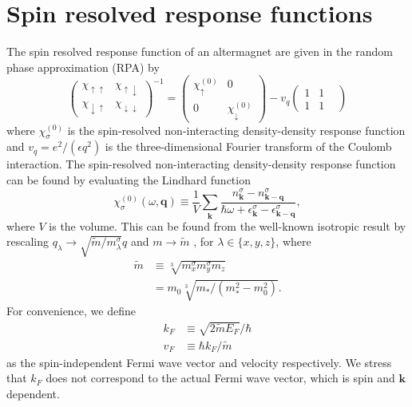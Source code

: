 \documentclass[aps,prb,reprint,twocolumns,superscriptaddress,nofootinbib]{revtex4-2}
\newcommand{\mdos}{\tilde{m}}
\newcommand{\kF}{k_{F}}
\begin{document}
	\section{Spin resolved response functions}
	The spin resolved response function of an altermagnet are given in the random phase approximation (RPA) by \cite{giulianiQuantumTheoryElectron2005}
	\begin{equation}
		\begin{pmatrix}
			\chi_{\uparrow\uparrow} & \chi_{\uparrow\downarrow} \\ 
			\chi_{\downarrow\uparrow} & \chi_{\downarrow\downarrow}
		\end{pmatrix}^{-1} = \begin{pmatrix}
			\chi_\uparrow^{(0)} & 0 \\
			0 & \chi_\downarrow^{(0)}
		\end{pmatrix}
		- v_q \begin{pmatrix}
			1 & 1 & \\ 1 & 1 
		\end{pmatrix} \label{eq:chi-rpa}
	\end{equation}
	where $\chi_\sigma^{(0)}$ is the spin-resolved non-interacting density-density response function and $v_q=e^2 / (\epsilon q^2)$ is the three-dimensional Fourier transform of the Coulomb interaction. The spin-resolved non-interacting density-density response function can be found by evaluating the Lindhard function
	\begin{equation}
		\chi_\sigma^{(0)}(\omega,\bm q) \equiv \frac{1}{V} \sum_{\bm k} \frac{n_{\bm k}^\sigma - n_{\bm k-\bm q}^\sigma}{\hbar\omega + \epsilon_{\bm k}^\sigma - \epsilon_{\bm k-\bm q}^\sigma},
	\end{equation}
	where $V$ is the volume. This can be found from the well-known isotropic result \cite{giulianiQuantumTheoryElectron2005} by rescaling $q_\lambda\rightarrow \sqrt{\mdos/m_\lambda^\sigma} q$ and $m\rightarrow \mdos$ \cite{ahnAnisotropicFermionicQuasiparticles2021}, for $\lambda\in\{x,y,z\}$, 	 where
	\begin{align}
		\mdos&\equiv \sqrt[3]{m^\sigma_xm^\sigma_ym_z} \\
		&=m_0\sqrt[3]{m_*/(m_*^2-m_0^2)}.
	\end{align}
	For convenience, we define 
	\begin{align}
		\kF&\equiv\sqrt{2\mdos E_F}/\hbar \label{eq:kF} \\
		v_F&\equiv \hbar k_F/\mdos
	\end{align}
	as the spin-independent Fermi wave vector and velocity respectively. We stress that $\kF$ does not correspond to the actual Fermi wave vector, which is spin and $\bm k$ dependent.
	
\end{document}
